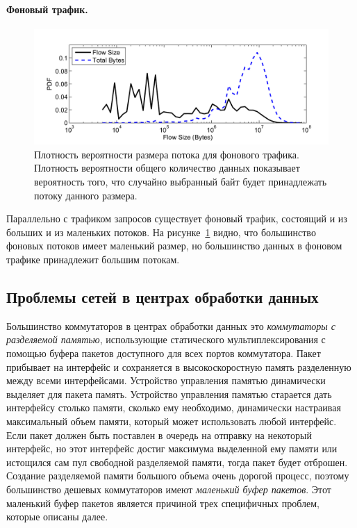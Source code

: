 \documentclass[14pt, a4paper,oneside]{extarticle}
\begin{document}
\paragraph{Фоновый трафик.}
\begin{figure}
\includegraphics[width=\linewidth]{pdf_of_flow_size.png}
\caption{Плотность вероятности размера потока для фонового трафика. Плотность вероятности общего количество данных показывает вероятность того, что случайно выбранный байт будет принадлежать потоку данного размера.}
\label{pdf_of_flow_size}
\end{figure}

Параллельно с трафиком запросов существует фоновый трафик, состоящий и из больших и из маленьких потоков. %
На рисунке~\ref{pdf_of_flow_size} видно, что большинство фоновых потоков имеет маленький размер, но большинство данных в фоновом трафике принадлежит большим потокам.

\subsection{Проблемы сетей в центрах обработки данных}

Большинство коммутаторов в центрах обработки данных это \emph{коммутаторы с разделяемой памятью}, использующие статического мультиплексирования с помощью буфера пакетов доступного для всех портов коммутатора. Пакет прибывает на интерфейс и сохраняется в высокоскоростную память разделенную между всеми интерфейсами. Устройство управления памятью динамически выделяет для пакета память. Устройство управления памятью старается дать интерфейсу столько памяти, сколько ему необходимо, динамически настраивая максимальный объем памяти, который может использовать любой интерфейс.
Если пакет должен быть поставлен в очередь на отправку на некоторый интерфейс, но этот интерфейс достиг максимума выделенной ему памяти или истощился сам пул свободной разделяемой памяти, тогда пакет будет отброшен. Создание разделяемой памяти большого объема очень дорогой процесс, поэтому большинство дешевых коммутаторов имеют \emph{маленький буфер пакетов}. Этот маленький буфер пакетов является причиной трех специфичных проблем, которые описаны далее.
\end{document}
